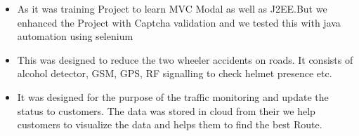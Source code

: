 \documentclass[10pt,a4paper,ragged2e]{altacv}
\begin{document}
\begin{itemize}
\item As it was training Project to learn MVC Modal as well as J2EE.But we enhanced the Project with Captcha validation and we tested this with java automation using selenium
\end{itemize}

\begin{itemize}
\item This was designed to reduce the two wheeler accidents on roads. It consists of alcohol detector, GSM, GPS, RF signalling to check helmet presence etc.
\end{itemize}

\begin{itemize}
\item  It was designed for the purpose of the traﬃc monitoring and update the status to customers. The data was stored in cloud from their we help customers to visualize the data and helps them to ﬁnd the best Route. 
\end{itemize}







%
\end{document}
